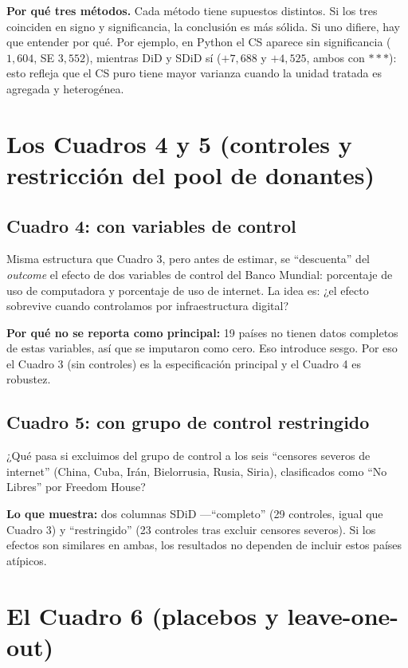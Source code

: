 \documentclass[11pt,a4paper]{article}
\begin{document}
\textbf{Por qué tres métodos.} Cada método tiene supuestos distintos. Si los tres coinciden en signo y significancia, la conclusión es más sólida. Si uno difiere, hay que entender por qué. Por ejemplo, en Python el CS aparece sin significancia ($1{,}604$, SE $3{,}552$), mientras DiD y SDiD sí ($+7{,}688$ y $+4{,}525$, ambos con $***$): esto refleja que el CS puro tiene mayor varianza cuando la unidad tratada es agregada y heterogénea.

\section{Los Cuadros 4 y 5 (controles y restricción del pool de donantes)}

\subsection{Cuadro 4: con variables de control}

Misma estructura que Cuadro 3, pero antes de estimar, se ``descuenta'' del \textit{outcome} el efecto de dos variables de control del Banco Mundial: porcentaje de uso de computadora y porcentaje de uso de internet. La idea es: ¿el efecto sobrevive cuando controlamos por infraestructura digital?

\textbf{Por qué no se reporta como principal:} 19 países no tienen datos completos de estas variables, así que se imputaron como cero. Eso introduce sesgo. Por eso el Cuadro 3 (sin controles) es la especificación principal y el Cuadro 4 es robustez.

\subsection{Cuadro 5: con grupo de control restringido}

¿Qué pasa si excluimos del grupo de control a los seis ``censores severos de internet'' (China, Cuba, Irán, Bielorrusia, Rusia, Siria), clasificados como ``No Libres'' por Freedom House?

\textbf{Lo que muestra:} dos columnas SDiD —``completo'' (29 controles, igual que Cuadro 3) y ``restringido'' (23 controles tras excluir censores severos). Si los efectos son similares en ambas, los resultados no dependen de incluir estos países atípicos.

\section{El Cuadro 6 (placebos y leave-one-out)}
\end{document}
